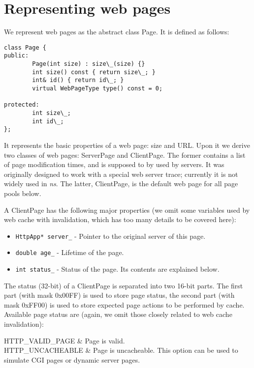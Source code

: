 \section{Representing web pages}

We represent web pages as the abstract class Page. It is defined as follows:

\begin{verbatim}
class Page {
public:
        Page(int size) : size\_(size) {}
        int size() const { return size\_; }
        int& id() { return id\_; }
        virtual WebPageType type() const = 0;

protected:
        int size\_;
        int id\_;
};
\end{verbatim}

It represents the basic properties of a web page: size and URL. Upon
it we derive two classes of web pages: ServerPage and ClientPage. The
former contains a list of page modification times, and is supposed to
by used by servers. It was originally designed to work with a special
web server trace; currently it is not widely used in \emph{ns}. The latter,
ClientPage, is the default web page for all page pools below. 

A ClientPage has the following major properties (we omit some
variables used by web cache with invalidation, which has too many
details to be covered here):

\begin{itemize}
\item {\tt HttpApp* server\_} - Pointer to the original server of this
  page. 
\item {\tt double age\_} - Lifetime of the page.
\item {\tt int status\_} - Status of the page. Its contents are
  explained below.
\end{itemize}

The status (32-bit) of a ClientPage is separated into two 16-bit
parts. The first part (with mask 0x00FF) is used to store page
status, the second part (with mask 0xFF00) is used to store expected
page actions to be performed by cache. Available page status are (again,
we omit those closely related to web cache invalidation):

\begin{\par\tabular{\textwidth}{rX}}
HTTP\_VALID\_PAGE & Page is valid. \\
HTTP\_UNCACHEABLE & Page is uncacheable. This option can be used to
simulate CGI pages or dynamic server pages. \\
\end{\par\tabular{\textwidth}{rX}}

